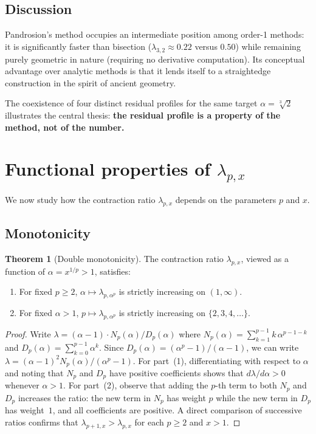 \documentclass[11pt,a4paper]{article}
\theoremstyle{definition}
\newtheorem{theorem}{Theorem}[section]
\newcommand{\cbrt}[1]{\sqrt[3]{#1}}
\begin{document}
\subsection{Discussion}

Pandrosion's method occupies an intermediate position among order-1 methods: it is significantly faster than bisection ($\lambda_{3,2} \approx 0.22$ versus $0.50$) while remaining purely geometric in nature (requiring no derivative computation).  Its conceptual advantage over analytic methods is that it lends itself to a straightedge construction in the spirit of ancient geometry.

The coexistence of four distinct residual profiles for the same target $\alpha = \cbrt{2}$ illustrates the central thesis: \textbf{the residual profile is a property of the method, not of the number.}

\section{Functional properties of \texorpdfstring{$\lambda_{p,x}$}{lambda}}
\label{sec:functional}

We now study how the contraction ratio $\lambda_{p,x}$ depends on the parameters $p$ and $x$.

\subsection{Monotonicity}

\begin{theorem}[Double monotonicity]
\label{thm:monotonicity}
The contraction ratio $\lambda_{p,x}$, viewed as a function of $\alpha = x^{1/p} > 1$, satisfies:
\begin{enumerate}
  \item For fixed $p \geq 2$, $\alpha \mapsto \lambda_{p,\alpha^p}$ is strictly increasing on $(1,\infty)$.
  \item For fixed $\alpha > 1$, $p \mapsto \lambda_{p,\alpha^p}$ is strictly increasing on $\{2,3,4,\ldots\}$.
\end{enumerate}
\end{theorem}

\begin{proof}
Write $\lambda = (\alpha-1) \cdot N_p(\alpha) / D_p(\alpha)$ where $N_p(\alpha) = \sum_{k=1}^{p-1} k\,\alpha^{p-1-k}$ and $D_p(\alpha) = \sum_{k=0}^{p-1} \alpha^k$. Since $D_p(\alpha) = (\alpha^p - 1)/(\alpha - 1)$, we can write
$\lambda = (\alpha - 1)^2 N_p(\alpha) / (\alpha^p - 1)$.
For part~(1), differentiating with respect to $\alpha$ and noting that $N_p$ and $D_p$ have positive coefficients shows that $d\lambda/d\alpha>0$ whenever $\alpha>1$.  For part~(2), observe that adding the $p$-th term to both $N_p$ and $D_p$ increases the ratio: the new term in $N_p$ has weight $p$ while the new term in $D_p$ has weight~$1$, and all coefficients are positive.  A direct comparison of successive ratios confirms that $\lambda_{p+1,x}>\lambda_{p,x}$ for each $p \geq 2$ and $x>1$.
\end{proof}
\end{document}

